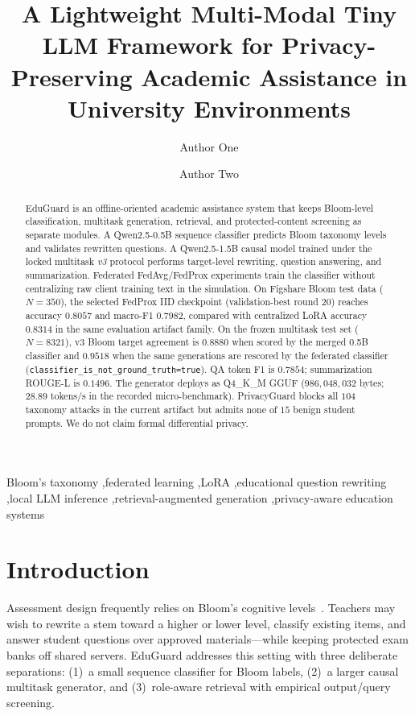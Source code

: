 \documentclass[review,12pt]{elsarticle}
\begin{document}
\begin{frontmatter}

\title{A Lightweight Multi-Modal Tiny LLM Framework for Privacy-Preserving Academic Assistance in University Environments}

\author[aff1]{Author One}
\author[aff1]{Author Two}


\begin{abstract}
EduGuard is an offline-oriented academic assistance system that keeps Bloom-level classification, multitask generation, retrieval, and protected-content screening as separate modules.
A Qwen2.5-0.5B sequence classifier predicts Bloom taxonomy levels and validates rewritten questions.
A Qwen2.5-1.5B causal model trained under the locked multitask \emph{v3} protocol performs target-level rewriting, question answering, and summarization.
Federated FedAvg/FedProx experiments train the classifier without centralizing raw client training text in the simulation.
On Figshare Bloom test data ($N{=}350$), the selected FedProx IID checkpoint (validation-best round 20) reaches accuracy $0.8057$ and macro-F1 $0.7982$, compared with centralized LoRA accuracy $0.8314$ in the same evaluation artifact family.
On the frozen multitask test set ($N{=}8321$), v3 Bloom target agreement is $0.8880$ when scored by the merged 0.5B classifier and $0.9518$ when the same generations are rescored by the federated classifier (\texttt{classifier\_is\_not\_ground\_truth=true}).
QA token F1 is $0.7854$; summarization ROUGE-L is $0.1496$.
The generator deploys as Q4\_K\_M GGUF ($986{,}048{,}032$ bytes; $28.89$ tokens/s in the recorded micro-benchmark).
PrivacyGuard blocks all $104$ taxonomy attacks in the current artifact but admits none of $15$ benign student prompts.
We do not claim formal differential privacy.
\end{abstract}

\begin{keyword}
Bloom's taxonomy \sep federated learning \sep LoRA \sep educational question rewriting \sep local LLM inference \sep retrieval-augmented generation \sep privacy-aware education systems
\end{keyword}

\end{frontmatter}

\linenumbers

\section{Introduction}
Assessment design frequently relies on Bloom's cognitive levels~\cite{bloom1956taxonomy,anderson2001revision}.
Teachers may wish to rewrite a stem toward a higher or lower level, classify existing items, and answer student questions over approved materials---while keeping protected exam banks off shared servers.
EduGuard addresses this setting with three deliberate separations: (1)~a small sequence classifier for Bloom labels, (2)~a larger causal multitask generator, and (3)~role-aware retrieval with empirical output/query screening.
\end{document}
